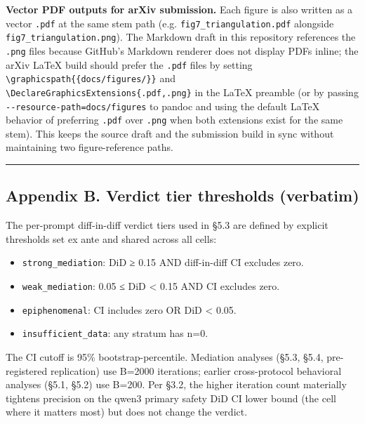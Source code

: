 \documentclass[
]{article}
\providecommand{\tightlist}{%
  \setlength{\itemsep}{0pt}\setlength{\parskip}{0pt}}
\begin{document}
\textbf{Vector PDF outputs for arXiv submission.} Each figure is also
written as a vector \texttt{.pdf} at the same stem path (e.g.
\texttt{fig7\_triangulation.pdf} alongside
\texttt{fig7\_triangulation.png}). The Markdown draft in this repository
references the \texttt{.png} files because GitHub's Markdown renderer
does not display PDFs inline; the arXiv LaTeX build should prefer the
\texttt{.pdf} files by setting
\texttt{\textbackslash{}graphicspath\{\{docs/figures/\}\}} and
\texttt{\textbackslash{}DeclareGraphicsExtensions\{.pdf,.png\}} in the
LaTeX preamble (or by passing \texttt{-\/-resource-path=docs/figures} to
pandoc and using the default LaTeX behavior of preferring \texttt{.pdf}
over \texttt{.png} when both extensions exist for the same stem). This
keeps the source draft and the submission build in sync without
maintaining two figure-reference paths.

\begin{center}\rule{0.5\linewidth}{0.5pt}\end{center}

\subsection{Appendix B. Verdict tier thresholds
(verbatim)}\label{appendix-b.-verdict-tier-thresholds-verbatim}

The per-prompt diff-in-diff verdict tiers used in §5.3 are defined by
explicit thresholds set ex ante and shared across all cells:

\begin{itemize}
\tightlist
\item
  \texttt{strong\_mediation}: \textbar DiD\textbar{} ≥ 0.15 AND
  diff-in-diff CI excludes zero.
\item
  \texttt{weak\_mediation}: 0.05 ≤ \textbar DiD\textbar{} \textless{}
  0.15 AND CI excludes zero.
\item
  \texttt{epiphenomenal}: CI includes zero OR \textbar DiD\textbar{}
  \textless{} 0.05.
\item
  \texttt{insufficient\_data}: any stratum has n=0.
\end{itemize}

The CI cutoff is 95\% bootstrap-percentile. Mediation analyses (§5.3,
§5.4, pre-registered replication) use B=2000 iterations; earlier
cross-protocol behavioral analyses (§5.1, §5.2) use B=200. Per §3.2, the
higher iteration count materially tightens precision on the qwen3
primary safety DiD CI lower bound (the cell where it matters most) but
does not change the verdict.
\end{document}
